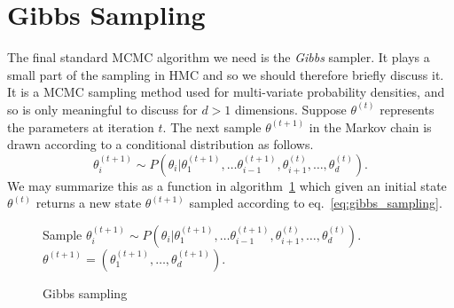 \section{Gibbs Sampling}
The final standard MCMC algorithm we need is the \textit{Gibbs} sampler. It plays a small
part of the sampling in HMC and so we should therefore briefly discuss it.
It is a MCMC sampling method used for multi-variate probability densities, and
so is only meaningful to discuss for $d > 1$ dimensions.
Suppose $\theta^{(t)}$ represents the parameters at iteration $t$. 
The next sample $\theta^{(t+1)}$ in the Markov chain is drawn according to a
conditional distribution as follows.
\begin{equation}\label{eq:gibbs_sampling}
  \theta_i^{(t+1)} \sim P(\theta_i|\theta_{1}^{(t+1)}, \ldots \theta_{i-1}^{(t+1)}, \theta_{i+1}^{(t)}, \ldots, \theta_{d}^{(t)}).
\end{equation}
We may summarize this as a function in algorithm~\ref{algo:gibbs} which 
given an initial state $\theta^{(t)}$ returns a new state $\theta^{(t+1)}$
sampled according to eq.~\eqref{eq:gibbs_sampling}.
\begin{figure}[H]
  \begin{algorithm}[H]
    \caption{Gibbs sampling}\label{algo:gibbs}
    \begin{algorithmic}
          \State Sample $\theta_i^{(t+1)} \sim P(\theta_i|\theta_{1}^{(t+1)}, \ldots \theta_{i-1}^{(t+1)}, \theta_{i+1}^{(t)}, \ldots, \theta_{d}^{(t)}).$
        \EndFor \\
        \Return $\theta^{(t+1)} = \left(\theta_1^{(t+1)}, \ldots, \theta_d^{(t+1)}\right)$.
      \EndFunction
    \end{algorithmic}
  \end{algorithm}
\end{figure}


